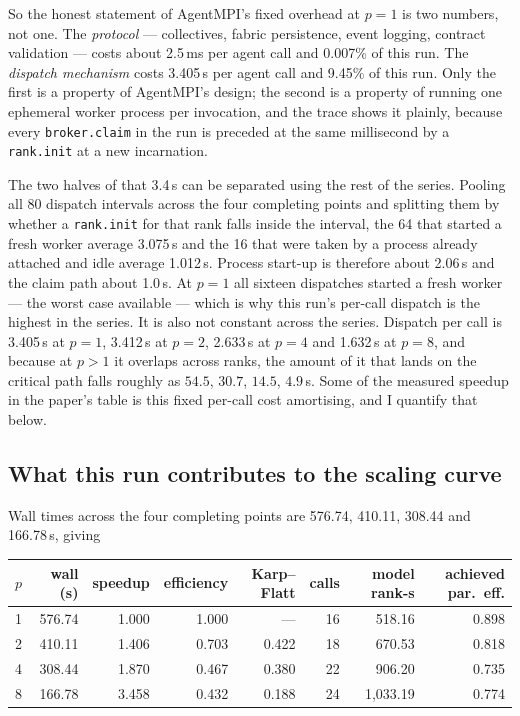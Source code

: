 \documentclass[11pt]{article}
\begin{document}
So the honest statement of AgentMPI's fixed overhead at $p=1$ is two numbers, not one. The
\emph{protocol} --- collectives, fabric persistence, event logging, contract validation --- costs
about 2.5\,ms per agent call and 0.007\% of this run. The \emph{dispatch mechanism} costs 3.405\,s
per agent call and 9.45\% of this run. Only the first is a property of AgentMPI's design; the
second is a property of running one ephemeral worker process per invocation, and the trace shows
it plainly, because every \texttt{broker.claim} in the run is preceded at the same millisecond by
a \texttt{rank.init} at a new incarnation.

The two halves of that 3.4\,s can be separated using the rest of the series. Pooling all 80
dispatch intervals across the four completing points and splitting them by whether a
\texttt{rank.init} for that rank falls inside the interval, the 64 that started a fresh worker
average 3.075\,s and the 16 that were taken by a process already attached and idle average
1.012\,s. Process start-up is therefore about 2.06\,s and the claim path about 1.0\,s. At $p=1$
all sixteen dispatches started a fresh worker --- the worst case available --- which is why this
run's per-call dispatch is the highest in the series. It is also not constant across the series. Dispatch
per call is 3.405\,s at $p=1$, 3.412\,s at $p=2$, 2.633\,s at $p=4$ and 1.632\,s at $p=8$, and
because at $p>1$ it overlaps across ranks, the amount of it that lands on the critical path falls
roughly as $54.5$, $30.7$, $14.5$, $4.9$\,s. Some of the measured speedup in the paper's table is
this fixed per-call cost amortising, and I quantify that below.

\subsection*{What this run contributes to the scaling curve}

Wall times across the four completing points are 576.74, 410.11, 308.44 and 166.78\,s, giving

\begin{center}
\begin{tabular}{@{}rrrrrrrr@{}}
\toprule
  $p$ & wall (s) & speedup & efficiency & Karp--Flatt & calls & model rank-s & achieved par.\ eff. \\
\midrule
  1 & 576.74 & 1.000 & 1.000 & --- & 16 & 518.16 & 0.898 \\
  2 & 410.11 & 1.406 & 0.703 & 0.422 & 18 & 670.53 & 0.818 \\
  4 & 308.44 & 1.870 & 0.467 & 0.380 & 22 & 906.20 & 0.735 \\
  8 & 166.78 & 3.458 & 0.432 & 0.188 & 24 & 1{,}033.19 & 0.774 \\
\bottomrule
\end{tabular}
\end{center}
\end{document}
